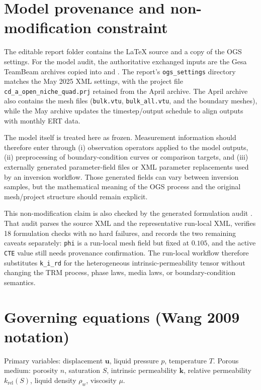 \documentclass[10pt,a4paper]{article}
\newcommand{\uu}{\bm{u}}
\newcommand{\TT}{T}
\newcommand{\pp}{p}
\newcommand{\rhoW}{\rho_w}
\newcommand{\muW}{\mu}
\newcommand{\npor}{n}
\newcommand{\Sat}{S}
\newcommand{\kperm}{\bm{k}}
\newcommand{\krel}{k_{\mathrm{rel}}(\Sat)}
\begin{document}
\section{Model provenance and non-modification constraint}
The editable report folder contains the LaTeX source and a copy of the OGS settings.
For the model audit, the authoritative exchanged inputs are the Gesa TeamBeam archives
copied into
 and
.
The report's \texttt{ogs\_settings} directory matches the May 2025 XML settings, with the
project file \texttt{cd\_a\_open\_niche\_quad.prj} retained from the April archive.
The April archive also contains the mesh files (\texttt{bulk.vtu}, \texttt{bulk\_all.vtu},
and the boundary meshes), while the May archive updates the timestep/output schedule to
align outputs with monthly ERT data.

The model itself is treated here as frozen. Measurement information should therefore enter
through (i) observation operators applied to the model outputs, (ii) preprocessing of
boundary-condition curves or comparison targets, and (iii) externally generated
parameter-field files or XML parameter replacements used by an inversion workflow.
Those generated fields can vary between inversion samples, but the mathematical meaning
of the OGS process and the original mesh/project structure should remain explicit.

This non-modification claim is also checked by the generated formulation audit
.  That audit parses the
source XML and the representative run-local XML, verifies 18 formulation checks with
no hard failures, and records the two remaining caveats separately: \texttt{phi} is a
run-local mesh field but fixed at \(0.105\), and the active \texttt{CTE} value still
needs provenance confirmation.  The run-local workflow therefore substitutes
\texttt{k\_i\_rd} for the heterogeneous intrinsic-permeability tensor without changing
the TRM process, phase laws, media laws, or boundary-condition semantics.

\section{Governing equations (Wang 2009 notation)}
Primary variables: displacement \(\uu\), liquid pressure \(\pp\), temperature \(\TT\).
Porous medium: porosity \(\npor\), saturation \(\Sat\), intrinsic permeability \(\kperm\), relative permeability \(\krel\),
liquid density \(\rhoW\), viscosity \(\muW\).
\end{document}

